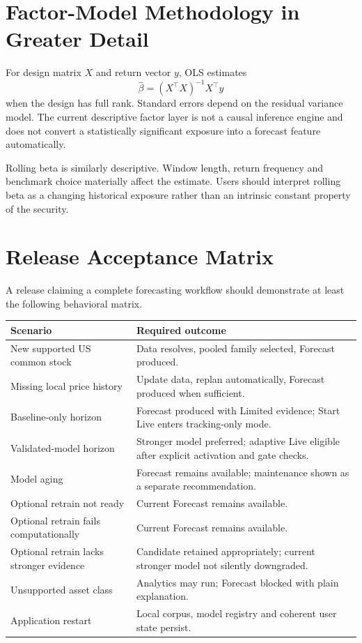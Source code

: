 \documentclass[11pt]{article}
\begin{document}
\section{Factor-Model Methodology in Greater Detail}
For design matrix $X$ and return vector $y$, OLS estimates
\begin{equation}
\hat\beta=(X^\top X)^{-1}X^\top y
\end{equation}
when the design has full rank. Standard errors depend on the residual variance model. The current descriptive factor layer is not a causal inference engine and does not convert a statistically significant exposure into a forecast feature automatically.

Rolling beta is similarly descriptive. Window length, return frequency and benchmark choice materially affect the estimate. Users should interpret rolling beta as a changing historical exposure rather than an intrinsic constant property of the security.

\section{Release Acceptance Matrix}
A release claiming a complete forecasting workflow should demonstrate at least the following behavioral matrix.
\begin{longtable}{p{}p{}}
\toprule
Scenario & Required outcome\\
\midrule
\endhead
New supported US common stock & Data resolves, pooled family selected, Forecast produced.\\
Missing local price history & Update data, replan automatically, Forecast produced when sufficient.\\
Baseline-only horizon & Forecast produced with Limited evidence; Start Live enters tracking-only mode.\\
Validated-model horizon & Stronger model preferred; adaptive Live eligible after explicit activation and gate checks.\\
Model aging & Forecast remains available; maintenance shown as a separate recommendation.\\
Optional retrain not ready & Current Forecast remains available.\\
Optional retrain fails computationally & Current Forecast remains available.\\
Optional retrain lacks stronger evidence & Candidate retained appropriately; current stronger model not silently downgraded.\\
Unsupported asset class & Analytics may run; Forecast blocked with plain explanation.\\
Application restart & Local corpus, model registry and coherent user state persist.\\
\bottomrule
\end{longtable}
\end{document}

